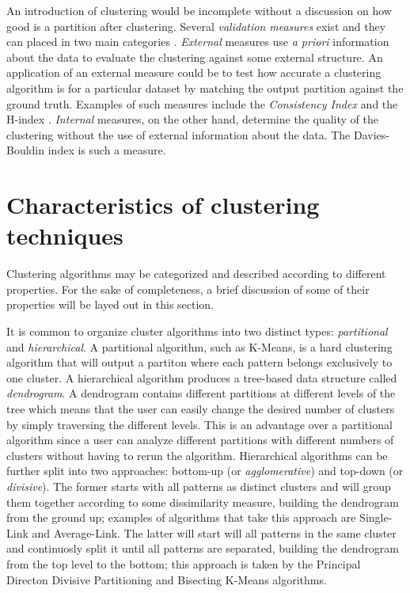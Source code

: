 An introduction of clustering would be incomplete without a discussion on how good is a partition after clustering.
Several \emph{validation measures} exist and they can placed in two main categories \cite{Aggarwal2014}.
\emph{External} measures use \emph{a priori} information about the data to evaluate the clustering against some external structure.
An application of an external measure could be to test how accurate a clustering algorithm is for a particular dataset by matching the output partition against the ground truth.
Examples of such measures include the \emph{Consistency Index} \cite{Fred2001} and the H-index \cite{Meila2003}. %
\emph{Internal} measures, on the other hand, determine the quality of the clustering without the use of external information about the data.
The Davies-Bouldin index \cite{davies1979cluster} is such a measure.




\section{Characteristics of clustering techniques}
\label{sec:clustering properties}

Clustering algorithms may be categorized and described according to different properties.
For the sake of completeness, a brief discussion of some of their properties will be layed out in this section.

It is common to organize cluster algorithms into two distinct types: \emph{partitional} and \emph{hierarchical}.
A partitional algorithm, such as K-Means, is a hard clustering algorithm that will output a partiton where each pattern belongs exclusively to one cluster.
A hierarchical algorithm produces a tree-based data structure called \emph{dendrogram}.
A dendrogram contains different partitions at different levels of the tree which means that the user can easily change the desired number of clusters by simply traversing the different levels.
This is an advantage over a partitional algorithm since a user can analyze different partitions with different numbers of clusters without having to rerun the algorithm.
Hierarchical algorithms can be further split into two approaches: bottom-up (or \emph{agglomerative}) and top-down (or \emph{divisive}).
The former starts with all patterns as distinct clusters and will group them together according to some dissimilarity measure, building the dendrogram from the ground up; examples of algorithms that take this approach are Single-Link and Average-Link.
The latter will start will all patterns in the same cluster and continuosly split it until all patterns are separated, building the dendrogram from the top level to the bottom; this approach is taken by the Principal Directon Divisive Partitioning\cite{Boley1998} and Bisecting K-Means \cite{Steinbach2000} algorithms.



